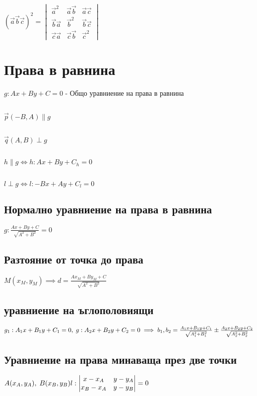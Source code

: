 \documentclass{article}
\newcommand{\vectr}{\overrightarrow}
\begin{document}
    \subsection{}
    \((\vectr{a}\vectr{b}\vectr{c})^2 = \begin{vmatrix}
        \vectr{a}^2 & \vectr{a}\vectr{b} & \vectr{a}\vectr{c} \\
        \vectr{b}\vectr{a} & \vectr{b}^2 & \vectr{b}\vectr{c} \\
        \vectr{c}\vectr{a} & \vectr{c}\vectr{b} & \vectr{c}^2
    \end{vmatrix}\)
    \section{Права в равнина}
    \(g : Ax + By + C = 0\) - Общо уравниение на права в равнина
    \subsection{}
    \(\vectr{p}(-B, A) \parallel g\)
    \subsection{}
    \(\vectr{q}(A, B) \perp g\)
    \subsection{}
    \(h \parallel g \iff h : Ax + By + C_h = 0\)
    \subsection{}
    \(l \perp g \iff l : -Bx + Ay + C_l = 0\)
    \subsection{Нормално уравниение на права в равнина}
    \(g : \frac{Ax + By + C}{\sqrt{A^2 + B^2}} = 0\)
    \subsection{Разтояние от точка до права}
    \(M(x_M, y_M) \implies d = \frac{Ax_M + By_M + C}{\sqrt{A^2 + B^2}}\)
    \subsection{уравниение на ъглополовиящи}
    \(g_1 : A_1x + B_1y + C_1 = 0, \; g : A_2x + B_2y + C_2 = 0\\
    \\\implies b_1, b_2 = \frac{A_1x + B_1y + C_1}{\sqrt{A_1^2 + B_1^2}} \pm \frac{A_2x + B_2y + C_2}{\sqrt{A_2^2 + B_2^2}}\)
    \subsection{Уравниение на права минаваща през две точки}
    \(A(x_A, y_A), \; B(x_B, y_B)\\
    \\l : \begin{vmatrix}
        x - x_A & y - y_A\\
        x_B - x_A & y - y_B
    \end{vmatrix} = 0\)
\end{document}
